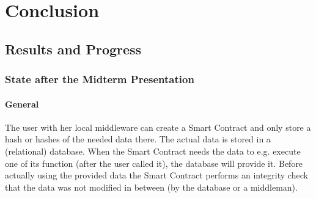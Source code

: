 \section{Conclusion}
\subsection{Results and Progress}
\subsubsection{State after the Midterm Presentation}
\paragraph{General}
The user with her local middleware can create a Smart Contract and only store a hash or hashes of the needed data there. The actual data is stored in a (relational) database. When the Smart Contract needs the data to e.g. execute one of its function (after the user called it), the database will provide it. Before actually using the provided data the Smart Contract performs an integrity check that the data was not modified in between (by the database or a middleman).





